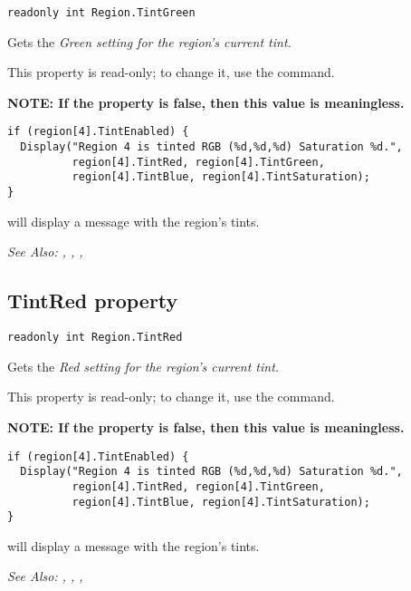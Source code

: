 \begin{verbatim}
readonly int Region.TintGreen
\end{verbatim}
Gets the \it{Green} setting for the region's current tint.

This property is read-only; to change it, use the  command.

\bf{NOTE:} If the  property is false, then
this value is meaningless.

\begin{verbatim}
if (region[4].TintEnabled) {
  Display("Region 4 is tinted RGB (%d,%d,%d) Saturation %d.",
          region[4].TintRed, region[4].TintGreen,
          region[4].TintBlue, region[4].TintSaturation);
}
\end{verbatim}
will display a message with the region's tints.

\it{See Also:} , ,
, 


\subsection{TintRed property}\label{Region.TintRed}%

\begin{verbatim}
readonly int Region.TintRed
\end{verbatim}
Gets the \it{Red} setting for the region's current tint.

This property is read-only; to change it, use the  command.

\bf{NOTE:} If the  property is false, then
this value is meaningless.

\begin{verbatim}
if (region[4].TintEnabled) {
  Display("Region 4 is tinted RGB (%d,%d,%d) Saturation %d.",
          region[4].TintRed, region[4].TintGreen,
          region[4].TintBlue, region[4].TintSaturation);
}
\end{verbatim}
will display a message with the region's tints.

\it{See Also:} , ,
, 


